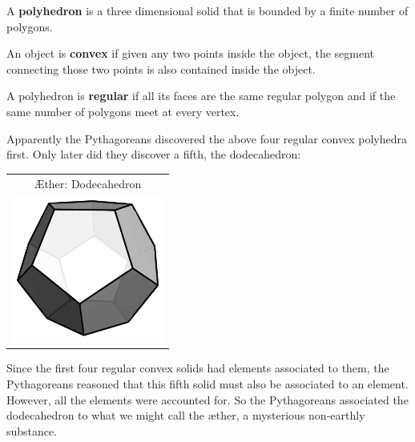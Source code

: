 \begin{dfn} 
A \textbf{polyhedron} is a three dimensional solid that is bounded by
a finite number of polygons.
\end{dfn}

\begin{dfn} 
An object is \textbf{convex} if given any two points inside the object,
the segment connecting those two points is also contained inside the
object.
\end{dfn}

\begin{dfn} 
A polyhedron is \textbf{regular} if all its faces are the same regular
polygon and if the same number of polygons meet at every vertex.
\end{dfn}

Apparently the Pythagoreans discovered the above four regular convex
polyhedra first. Only later did they discover a fifth, the
dodecahedron:
\begin{center}
\begin{tabular}{|c|}
\hline
\AE ther: Dodecahedron\\
\includegraphics{../graphics/dodecahedron.pdf} 
\\
\hline
\end{tabular}
\end{center}
Since the first four regular convex solids had elements associated to
them, the Pythagoreans reasoned that this fifth solid must also be
associated to an element. However, all the elements were accounted
for. So the Pythagoreans associated the dodecahedron to what we might
call the \ae ther, a mysterious non-earthly
substance.




